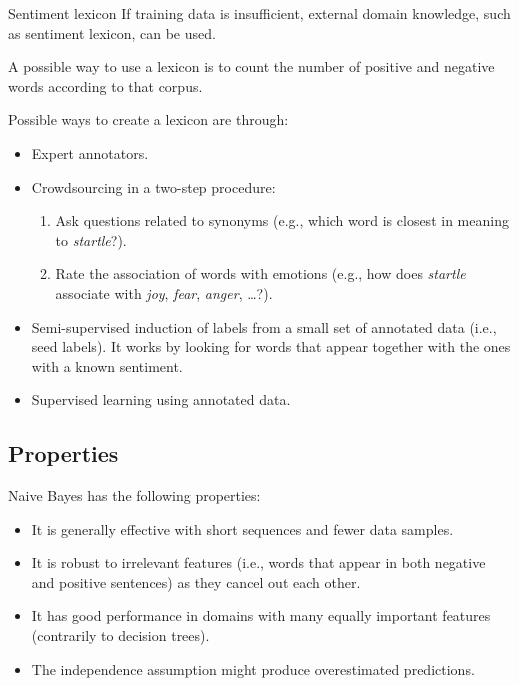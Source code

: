 \begin{descriptionlist}
    \item[Sentiment lexicon] 
        If training data is insufficient, external domain knowledge, such as sentiment lexicon, can be used.

        \begin{example}
            A possible way to use a lexicon is to count the number of positive and negative words according to that corpus.
        \end{example}

        \begin{remark}
            Possible ways to create a lexicon are through:
            \begin{itemize}
                \item Expert annotators.
                \item Crowdsourcing in a two-step procedure:
                    \begin{enumerate}
                        \item Ask questions related to synonyms (e.g., which word is closest in meaning to \textit{startle}?).
                        \item Rate the association of words with emotions (e.g., how does \textit{startle} associate with \textit{joy}, \textit{fear}, \textit{anger}, \dots?).
                    \end{enumerate}
                \item Semi-supervised induction of labels from a small set of annotated data (i.e., seed labels). It works by looking for words that appear together with the ones with a known sentiment.
                \item Supervised learning using annotated data.
            \end{itemize}
        \end{remark}
\end{descriptionlist}


\subsection{Properties}

Naive Bayes has the following properties:
\begin{itemize}
    \item It is generally effective with short sequences and fewer data samples.
    \item It is robust to irrelevant features (i.e., words that appear in both negative and positive sentences) as they cancel out each other.
    \item It has good performance in domains with many equally important features (contrarily to decision trees).
    \item The independence assumption might produce overestimated predictions.
\end{itemize}

